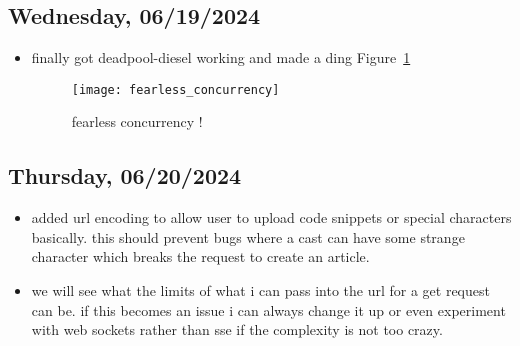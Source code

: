 \subsection*{Wednesday, 06/19/2024}
\begin{itemize}
    \item finally got deadpool-diesel working and made a ding
        Figure~\ref{fig:fearless_concurrency}
        \begin{figure}[ht]
            \centering
            \texttt{[image: fearless\_concurrency]}
            \captionsetup{labelfont=bf, textfont=it}
            \caption{fearless concurrency !}
            \label{fig:fearless_concurrency}
        \end{figure}
\end{itemize}

\clearpage
\subsection*{Thursday, 06/20/2024}
\begin{itemize}
    \item added url encoding to allow user to upload code snippets or special
        characters basically. this should prevent bugs where a cast can have
        some strange character which breaks the request to create an article.
    \item we will see what the limits of what i can pass into the url for a get
        request can be. if this becomes an issue i can always change it up or
        even experiment with web sockets rather than sse if the complexity is
        not too crazy.
\end{itemize}

\clearpage
